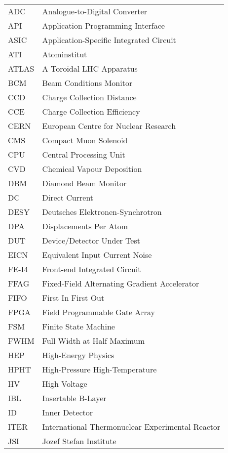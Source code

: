\begin{acronyms}

\begin{tabular}{l*{1}{l}}
ADC	&	Analogue-to-Digital Converter	\\
API	&	Application Programming Interface	\\
ASIC	&	Application-Specific Integrated Circuit	\\
ATI	&	Atominstitut	\\
ATLAS	&	A Toroidal LHC Apparatus	\\
BCM	&	Beam Conditions Monitor	\\
CCD	&	Charge Collection Distance	\\
CCE	&	Charge Collection Efficiency	\\
CERN	&	European Centre for Nuclear Research	\\
CMS	&	Compact Muon Solenoid	\\
CPU	&	Central Processing Unit	\\
CVD	&	Chemical Vapour Deposition	\\
DBM	&	Diamond Beam Monitor	\\
DC	&	Direct Current	\\
DESY	&	Deutsches Elektronen-Synchrotron	\\
DPA	&	Displacements Per Atom	\\
DUT	&	Device/Detector Under Test	\\
EICN	&	Equivalent Input Current Noise	\\
FE-I4	&	Front-end Integrated Circuit	\\
FFAG	&	Fixed-Field Alternating Gradient Accelerator	\\
FIFO	&	First In First Out	\\
FPGA	&	Field Programmable Gate Array	\\
FSM	&	Finite State Machine	\\
FWHM	&	Full Width at Half Maximum	\\
HEP	&	High-Energy Physics	\\
HPHT	&	High-Pressure High-Temperature	\\
HV	&	High Voltage	\\
IBL	&	Insertable B-Layer	\\
ID	&	Inner Detector	\\
ITER	&	International Thermonuclear Experimental Reactor	\\
JSI	&	Jozef Stefan Institute	\\

\end{tabular}
\end{acronyms}
